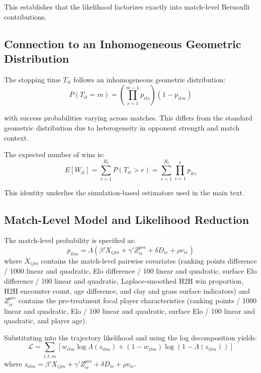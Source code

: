 This establishes that the likelihood factorizes exactly into match-level Bernoulli contributions.

\subsection{Connection to an Inhomogeneous Geometric Distribution}
\label{app:geometric}

The stopping time $T_{it}$ follows an inhomogeneous geometric distribution:
\begin{equation}
P(T_{it} = m) =
\left( \prod_{s=1}^{m-1} p_{its} \right) (1 - p_{itm})
\end{equation}

with success probabilities varying across matches. This differs from the standard geometric distribution due to heterogeneity in opponent strength and match context.

The expected number of wins is:
\begin{equation}
E[W_{it}] = \sum_{r=1}^{R_t} P(T_{it} > r)
= \sum_{r=1}^{R_t} \prod_{s=1}^{r} p_{its}
\end{equation}

This identity underlies the simulation-based estimators used in the main text.

\subsection{Match-Level Model and Likelihood Reduction}
\label{app:match_model}

The match-level probability is specified as:
\begin{equation}
p_{itm} = \Lambda(\beta' X_{ijm} + \gamma' Z^{pre}_{ie} + \delta D_{ie} + \rho v_{ie})
\end{equation}
where $X_{ijm}$ contains the match-level pairwise covariates (ranking points difference / 1000 linear and quadratic, Elo difference / 100 linear and quadratic, surface Elo difference / 100 linear and quadratic, Laplace-smoothed H2H win proportion, H2H encounter count, age difference, and clay and grass surface indicators) and $Z^{pre}_{ie}$ contains the pre-treatment focal player characteristics (ranking points / 1000 linear and quadratic, Elo / 100 linear and quadratic, surface Elo / 100 linear and quadratic, and player age).

Substituting into the trajectory likelihood and using the log decomposition yields:
\begin{equation}
\mathcal{L} = \sum_{i,t,m}
\left[
w_{itm} \log \Lambda(z_{itm})
+ (1 - w_{itm}) \log (1 - \Lambda(z_{itm}))
\right]
\end{equation}
where $z_{itm} = \beta' X_{ijm} + \gamma' Z^{pre}_{ie} + \delta D_{ie} + \rho v_{ie}$.

